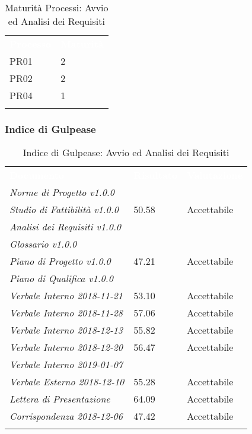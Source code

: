\begin{longtable}{|C{.47\textwidth}|C{.47\textwidth}|}
\hline
{}\textbf{\textcolor{white}{Processo}} & \textbf{\textcolor{white}{Maturità}}\\
PR01 & 2\\ 
\hline
{}PR02 & 2 \\
\hline
PR04 & 1 \\ 
\hline 
\caption{Maturità Processi: Avvio ed Analisi dei Requisiti}
\label{mat:aar}
\end{longtable}


\subsubsection{Indice di Gulpease}


\begin{longtable}{|C{.47\textwidth}|C{.22\textwidth}|C{.22\textwidth}|}
\hline
{}\textbf{\textcolor{white}{Documento}} & \textbf{\textcolor{white}{Risultato}} & \textbf{\textcolor{white}{Valutazione}}\\
\textit{Norme di Progetto v1.0.0} & & \\
\hline
{}\textit{Studio di Fattibilità v1.0.0} & 50.58 & Accettabile\\
\hline
\textit{Analisi dei Requisiti v1.0.0} & & \\
\hline
{}\textit{Glossario v1.0.0} & & \\
\hline
\textit{Piano di Progetto v1.0.0} & 47.21 & Accettabile \\
\hline
{}\textit{Piano di Qualifica v1.0.0} & & \\

\hline
\textit{Verbale Interno 2018-11-21} & 53.10 & Accettabile\\
\hline
{}\textit{Verbale Interno 2018-11-28} & 57.06 & Accettabile\\
\hline
\textit{Verbale Interno 2018-12-13} & 55.82 & Accettabile\\
\hline
{}\textit{Verbale Interno 2018-12-20} & 56.47 & Accettabile \\
\hline
\textit{Verbale Interno 2019-01-07} & & \\
\hline
{}\textit{Verbale Esterno 2018-12-10} & 55.28 & Accettabile\\
\hline

\textit{Lettera di Presentazione} & 64.09 & Accettabile\\
\hline
{}\textit{Corrispondenza 2018-12-06} & 47.42 & Accettabile\\
\hline

\caption{Indice di Gulpease: Avvio ed Analisi dei Requisiti}
\label{gulp:aar}
\end{longtable}





